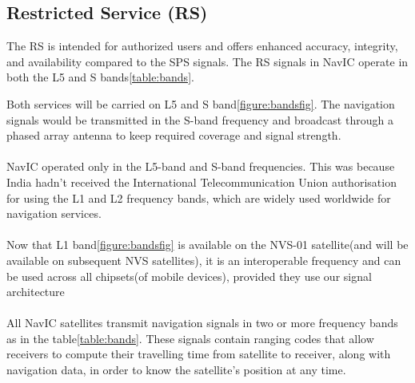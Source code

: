 \subsection{Restricted Service (RS)}
The RS is intended for authorized users and offers enhanced accuracy, integrity, and availability compared to the SPS signals. The RS signals in NavIC operate in both the L5 and S bands\ref{table:bands}.	

	
Both services will be carried on L5 and S band\ref{figure:bandsfig}. The navigation signals would be transmitted in the S-band frequency and broadcast through a phased array antenna to keep required coverage and signal strength.
\\
\\
NavIC operated only in the L5-band and S-band frequencies. This was because India hadn't received the International Telecommunication Union authorisation for using the L1 and L2 frequency bands, which are widely used worldwide for navigation services.
\\
\\
Now that L1 band\ref{figure:bandsfig} is available on the NVS-01 satellite(and will be available on subsequent NVS satellites), it is an interoperable frequency and can be used across all chipsets(of mobile devices), provided they use our signal architecture
\\
\\
All NavIC satellites transmit navigation signals in two or more frequency bands as in the table\ref{table:bands}. These signals contain ranging codes that allow receivers to compute their travelling time from satellite to receiver, along with navigation data, in order to know the satellite’s position at any time. 
%
